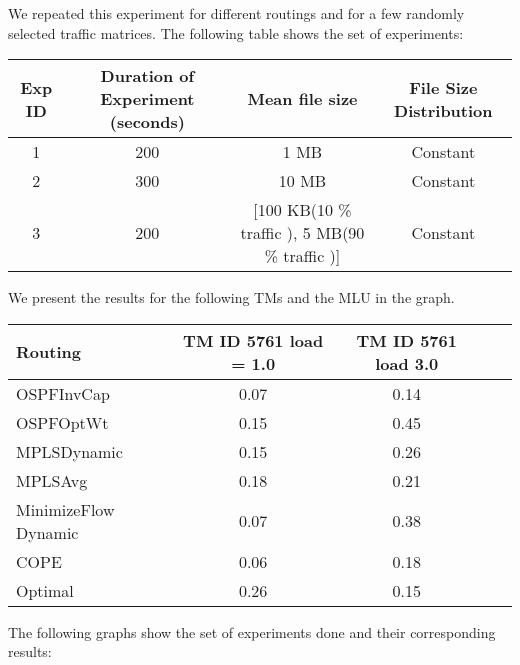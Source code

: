 We repeated this experiment for different routings and for a few randomly selected traffic matrices. The following table shows the set of experiments:

\begin{center}
  \begin{tabular}{|c | c | c | c |}
    \hline
Exp ID & Duration of Experiment (seconds) & Mean file size & File Size Distribution \\ \hline
1 &  200 & 1 MB & Constant\\ \hline
2 &  300 & 10 MB & Constant\\ \hline
3 &  200 & [100 KB(10 \% traffic ), 5 MB(90 \% traffic )] & Constant\\ \hline
    \hline
  \end{tabular}
\end{center}

We present the results for the following TMs and the MLU in the graph.

\begin{center}
  \begin{tabular}{|l | c |  c | c |  c |}
    \hline
Routing & TM ID 5761 load = 1.0  & TM ID 5761 load 3.0 \\ \hline
OSPFInvCap & 0.07 & 0.14 \\ \hline
OSPFOptWt & 0.15 & 0.45 \\ \hline
MPLSDynamic & 0.15 & 0.26 \\ \hline
MPLSAvg & 0.18 & 0.21 \\ \hline
MinimizeFlow Dynamic & 0.07 & 0.38 \\ \hline
COPE & 0.06 & 0.18 \\ \hline
Optimal & 0.26 & 0.15 \\ \hline
    \hline
  \end{tabular}
\end{center}

The following graphs show the set of experiments done and their corresponding results:

